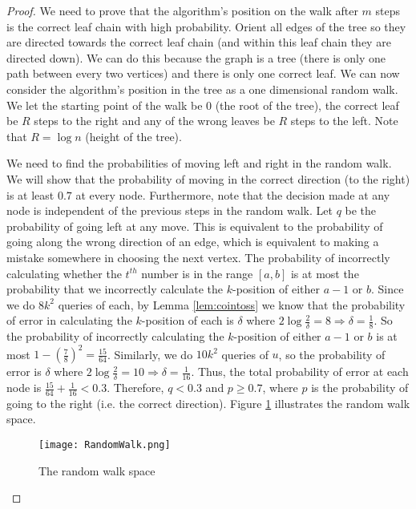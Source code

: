 \documentclass[12pt]{article}
\begin{document}
\begin{proof}
We need to prove that the algorithm's position on the walk after $m$ steps is the correct leaf chain with high probability. Orient all edges of the tree so they are directed towards the correct leaf chain (and within this leaf chain they are directed down). We can do this because the graph is a tree (there is only one path between every two vertices) and there is only one correct leaf. We can now consider the algorithm's position in the tree as a one dimensional random walk. We let the starting point of the walk be $0$ (the root of the tree), the correct leaf be $R$ steps to the right and any of the wrong leaves be $R$ steps to the left. Note that $R = \log{n}$ (height of the tree). 

We need to find the probabilities of moving left and right in the random walk. We will show that the probability of moving in the correct direction (to the right) is at least $0.7$ at every node. Furthermore, note that the decision made at any node is independent of the previous steps in the random walk. Let $q$ be the probability of going left at any move. This is equivalent to the probability of going along the wrong direction of an edge, which is equivalent to making a mistake somewhere in choosing the next vertex. The probability of incorrectly calculating whether the $t^{th}$ number is in the range $[a, b]$ is at most the probability that we incorrectly calculate the $k$-position of either $a-1$ or $b$. Since we do $8k^2$ queries of each, by Lemma \ref{lem:cointoss} we know that the probability of error in calculating the $k$-position of each is $\delta$ where $2\log{\frac{2}{\delta}} = 8 \Rightarrow \delta = \frac{1}{8}$. So the probability of incorrectly calculating the $k$-position of either $a-1$ or $b$ is at most $1 - \left(\frac{7}{8}\right)^2 = \frac{15}{64}$. Similarly, we do $10k^2$ queries of $u$, so the probability of error is $\delta$ where $2\log{\frac{2}{\delta}} = 10 \Rightarrow \delta = \frac{1}{16}$. Thus, the total probability of error at each node is $\frac{15}{64} + \frac{1}{16} < 0.3$. Therefore, $q < 0.3$ and $p \geq 0.7$, where $p$ is the probability of going to the right (i.e. the correct direction). Figure \ref{fig:randomwalk} illustrates the random walk space. 

\begin{figure}[ht]
	\centering
		\texttt{[image: RandomWalk.png]}
	\caption{The random walk space}
	\label{fig:randomwalk}
\end{figure} 


\end{proof}
\end{document}
